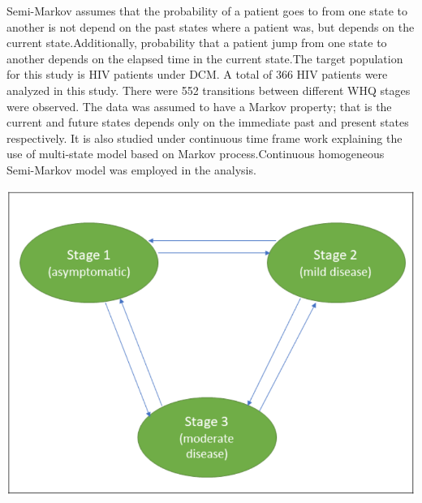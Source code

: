 \documentclass[11pt]{article}
\begin{document}
	Semi-Markov assumes that the probability of a patient goes to from one state to another is not depend on the past states where a patient was, but depends on the current state.Additionally, probability that a patient jump from one state to another depends on the elapsed time in the current state.The target population for this study is HIV patients under DCM. A total of 366 HIV patients were analyzed in this study. There were 552 transitions between different WHQ stages were observed. The data was assumed to have a Markov property; that is the current and future states depends only on the immediate past and present states respectively. It is also studied under continuous time frame work explaining the use of multi-state model based on Markov process.Continuous homogeneous Semi-Markov model was employed in the analysis. 
	\begin{center}
		\includegraphics[scale=0.5]{stages}\\
	\end{center}
\end{document}
